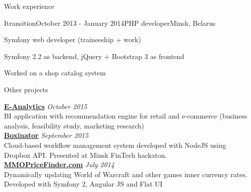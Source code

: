 \documentclass{resume} %
\begin{document}
\begin{rSection}{Work experience}
\begin{rSubsection}{Itransition}{October 2013 - January 2014}{PHP developer}{Minsk, Belarus}
\item Symfony web developer (traineeship + work)
\item Symfony 2.2 as backend, jQuery + Bootstrap 3 as frontend
\item Worked on a shop catalog system
\end{rSubsection}

\end{rSection}

\clearpage


\begin{rSection}{Other projects}

{\bf \href{http://pirateminds.com/e-analytics}{E-Analytics}} \hfill {\em October 2015} \\ 
BI application with recommendation engine for retail and e-commerce (business analysis, feasibility study, marketing research) \\

{\bf \href{http://boxinator.xyz}{Boxinator}} \hfill {\em September 2015} \\ 
Cloud-based workflow management system developed with NodeJS using Dropbox API. Presented at Minsk FinTech hackaton. \\

{\bf \href{http://mmopricefinder.com}{MMOPriceFinder.com}} \hfill {\em July 2014} \\ 
Dynamically updating World of Warcraft and other games inner currency rates. Developed with Symfony 2, Angular JS and Flat UI \\

\end{rSection}


\end{document}
